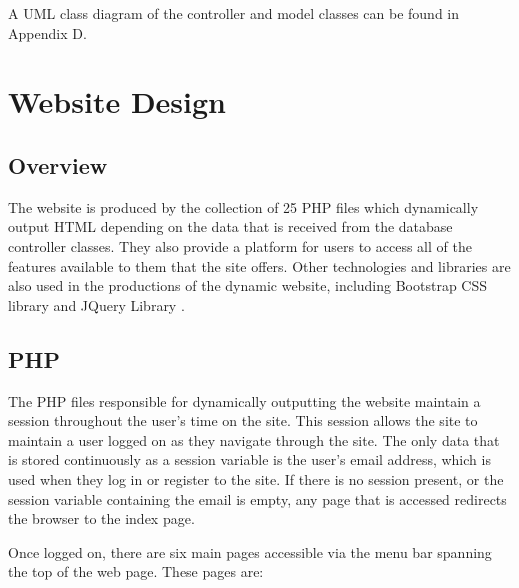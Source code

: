		A UML class diagram of the controller and model classes can be found in Appendix D. 		
		
\section{Website Design}
	\subsection{Overview}
		The website is produced by the collection of 25 PHP files which dynamically output HTML depending on the data that is received from the database controller classes. They also provide a platform for users to access all of the features available to them that the site offers. Other technologies and libraries are also used in the productions of the dynamic website, including Bootstrap CSS library \cite{bootstrap_css} and JQuery Library \cite{jquery_library}.
		
	\subsection{PHP}
		The PHP files responsible for dynamically outputting the website maintain a session throughout the user's time on the site. This session allows the site to maintain a user logged on as they navigate through the site. The only data that is stored continuously as a session variable is the user's email address, which is used when they log in or register to the site. If there is no session present, or the session variable containing the email is empty, any page that is accessed redirects the browser to the index page.
		
		Once logged on, there are six main pages accessible via the menu bar spanning the top of the web page. These pages are: 

